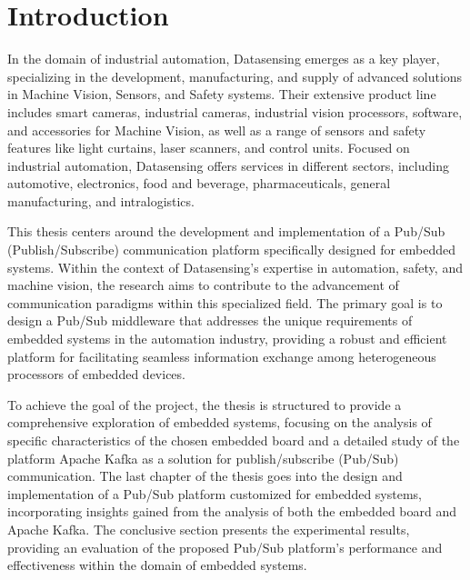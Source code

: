 

\chapter*{Introduction}

In the domain of industrial automation, Datasensing emerges as a key player, specializing in the development, manufacturing, and supply of advanced solutions in Machine Vision, Sensors, and Safety systems.
Their extensive product line includes smart cameras, industrial cameras, industrial vision processors, software, and accessories for Machine Vision, as well as a range of sensors and safety features like light curtains, laser scanners, and control units. Focused on industrial automation, Datasensing offers services in different sectors, including automotive, electronics, food and beverage, pharmaceuticals, general manufacturing, and intralogistics.

This thesis centers around the development and implementation of a Pub/Sub (Publish/Subscribe) communication platform specifically designed for embedded systems. Within the context of Datasensing's expertise in automation, safety, and machine vision, the research aims to contribute to the advancement of communication paradigms within this specialized field.
The primary goal is to design a Pub/Sub middleware that addresses the unique requirements of embedded systems in the automation industry, providing a robust and efficient platform for facilitating seamless information exchange among heterogeneous processors of embedded devices.

To achieve the goal of the project, the thesis is structured to provide a comprehensive exploration of embedded systems, focusing on the analysis of specific characteristics of the chosen embedded board and a detailed study of the platform Apache Kafka as a solution for publish/subscribe (Pub/Sub) communication.
The last chapter of the thesis goes into the design and implementation of a Pub/Sub platform customized for embedded systems, incorporating insights gained from the analysis of both the embedded board and Apache Kafka.
The conclusive section presents the experimental results, providing an evaluation of the proposed Pub/Sub platform's performance and effectiveness within the domain of embedded systems.
